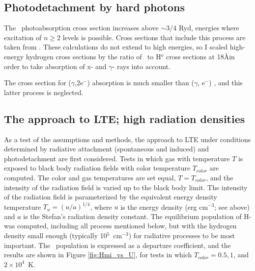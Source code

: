 \subsection{Photodetachment by hard photons}

The \hminus\ photoabsorption cross section increases above  $\sim$3/4 Ryd, energies
where excitation of $n\ge  2$ levels is possible.  Cross sections that include
this process are taken from \citet{Broad1976}.  These calculations
do not extend to high energies, so I scaled high-energy hydrogen cross
sections by the ratio of \hminus\ to H$^o$ cross sections at 18\AA  in order to take
absorption of x- and $\gamma$- rays into account.

The cross section for ($\gamma$,2e$^-$) absorption is much smaller than
($\gamma$, e$^-$) \citep{Broad1976}, and this latter process is neglected.

\subsection{The approach to LTE; high radiation densities}

As a test of the assumptions and methods, the approach to LTE under
conditions determined by radiative attachment (spontaneous and induced)
and photodetachment are first considered.  Tests in which gas with
temperature $T$ is exposed to black body radiation fields with color
temperature $T_{color}$ are computed.  The color and gas temperatures are set
equal, $T = T_{color}$, and the intensity of the radiation field is varied up
to the black body limit.  The intensity of the radiation field is
parameterized by the equivalent energy density temperature $T_u =
(u/a)^{1/4}$,
where $u$ is the energy density (erg cm$^{-3}$; see above) and $a$ is the Stefan's
radiation density constant.  The equilibrium population of H- was computed,
including all process mentioned below, but with the hydrogen density small
enough (typically  10$^5$~cm$^{-3}$) for radiative processes to be most important.
The \hminus\ population is expressed as a departure coefficient, and the results
are shown in Figure \ref{fig:Hmi_vs_U}, for tests in which $T_{color} = 0.5, 1$, and
$2\times 10^4$~K.

